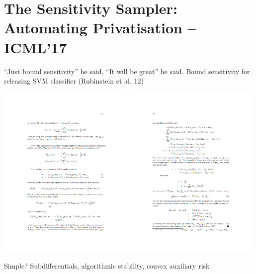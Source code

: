 \documentclass{beamer}
\begin{document}
\section{The Sensitivity Sampler: \\ Automating Privatisation -- ICML'17}

\begin{frame}{\alert{``Just bound sensitivity''} he said, ``It will be great'' he said.}
\pause Bound sensitivity for releasing SVM classifier (Rubinstein et al. 12)
\begin{center}
\includegraphics[width=0.49\textwidth, trim={0cm 3.5cm 0cm 3.5cm}, clip]{figures/paper-svm-2}
\hfill
\includegraphics[width=0.49\textwidth, trim={0cm 3.5cm 0cm 3.5cm}, clip]{figures/paper-svm-3}
\end{center}
\pause Simple? Subdifferentials, algorithmic stability, convex auxiliary risk 
\end{frame}
\end{document}
